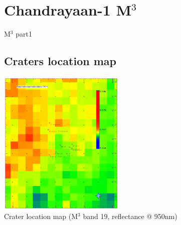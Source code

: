 \documentclass[aspectratio=169,unknownkeysallowed,xcolor=dvipsnames,beamer]{beamer} %
\begin{document}
\section{Chandrayaan-1 M$^3$}
{
\begin{frame}[plain]
\end{frame}}
\begin{frame}[fragile]{M$^3$ part1}
\subsection{Craters location map}
\begin{center}
  \includegraphics[width=6cm]{images/fig3}\\
  Crater location map (M$^3$ band 19, reflectance @ 950nm)
  \end{center}
\end{frame}
\end{document}
